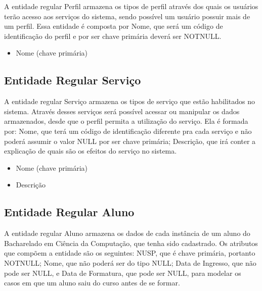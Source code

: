\documentclass[a4paper]{article}
\begin{document}
A entidade regular Perfil armazena os tipos de perfil através dos quais os
usuários terão acesso aos serviços do sistema, sendo possível um usuário possuir
mais de um perfil. Essa entidade é composta por Nome, que será um código
de identificação do perfil e por ser chave primária deverá ser NOTNULL.

\begin{itemize}
    \item Nome (chave primária)
\end{itemize}

\subsection*{Entidade Regular Serviço}

A entidade regular Serviço armazena os tipos de serviço que estão habilitados no
sistema. Através desses serviços será possível acessar ou manipular os dados
armazenados, desde que o perfil permita a utilização do serviço. Ela é formada
por: Nome, que terá um código de identificação diferente pra cada serviço
e não poderá assumir o valor NULL por ser chave primária; Descrição, que irá conter
a explicação de quais são os efeitos do serviço no sistema.

\begin{itemize}
    \item Nome (chave primária)
    \item Descrição
\end{itemize}

\subsection*{Entidade Regular Aluno}


A entidade regular Aluno armazena os dados de cada instância de um aluno do
Bacharelado em Ciência da Computação, que tenha sido cadastrado. Os atributos que
compõem a entidade são os seguintes: NUSP, que é chave primária, portanto NOTNULL;
Nome, que não poderá ser do tipo NULL; Data de Ingresso, que não pode ser NULL,
e Data de Formatura, que pode ser NULL, para modelar os casos em que um aluno
saiu do curso antes de se formar.
\end{document}
